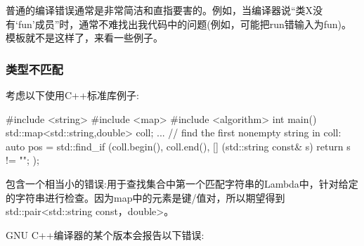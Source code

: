 普通的编译错误通常是非常简洁和直指要害的。例如，当编译器说“类X没有‘fun’成员”时，通常不难找出我代码中的问题(例如，可能把run错输入为fun)。模板就不是这样了，来看一些例子。

\subsubsection{类型不匹配}

考虑以下使用C++标准库例子:

\begin{cpp}
#include <string>
#include <map>
#include <algorithm>
int main()
{
	std::map<std::string,double> coll;
	...
	// find the first nonempty string in coll:
	auto pos = std::find_if (coll.begin(), coll.end(),
	[] (std::string const& s) {
		return s != "";
	});
}
\end{cpp}

包含一个相当小的错误:用于查找集合中第一个匹配字符串的Lambda中，针对给定的字符串进行检查。因为map中的元素是键/值对，所以期望得到std::pair<std::string const，double>。

GNU C++编译器的某个版本会报告以下错误:

